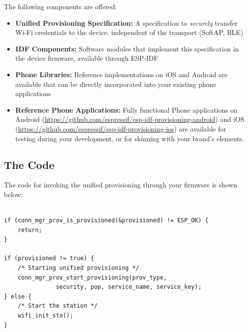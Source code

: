 \documentclass[main.tex]{subfiles}
\begin{document}
The following components are offered:
\begin{itemize}
    \item \textbf{Unified Provisioning Specification:} A specification to \textit{securely} transfer Wi-Fi credentials to the device, independent of the transport (SoftAP, BLE)
    \item \textbf{IDF Components:} Software modules that implement this specification in the device firmware, available through ESP-IDF
    \item \textbf{Phone Libraries:} Reference implementations on iOS and Android are available that can be directly incorporated into your existing phone applications
    \item \textbf{Reference Phone Applications:} Fully functional Phone applications on Android (\url{https://github.com/espressif/esp-idf-provisioning-android}) and iOS (\url{https://github.com/espressif/esp-idf-provisioning-ios}) are available for testing during your development, or for skinning with your brand's elements.
\end{itemize}

\subsection{The Code}\label{sec:unified_prov}
The code for invoking the unified provisioning through your firmware is shown below:
\begin{verbatim}

if (conn_mgr_prov_is_provisioned(&provisioned) != ESP_OK) {
    return;
}

if (provisioned != true) {
    /* Starting unified provisioning */
    conn_mgr_prov_start_provisioning(prov_type,
               security, pop, service_name, service_key);
} else {
    /* Start the station */
    wifi_init_sta();
}
\end{verbatim}
\end{document}
